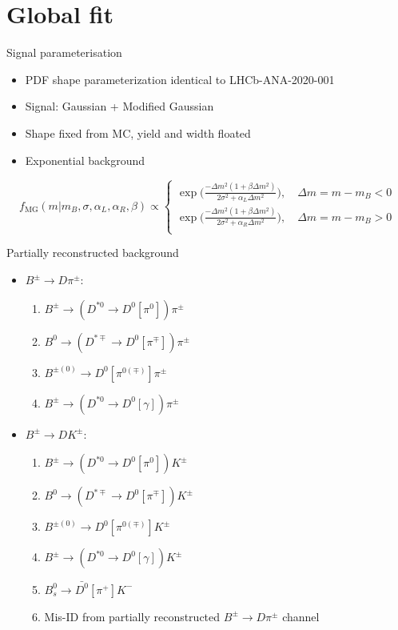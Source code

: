 \documentclass{beamer}
\begin{document}
\section{Global fit}
\begin{frame}{Signal parameterisation}
  \begin{itemize}
    \setlength\itemsep{1.2em}
    \item{PDF shape parameterization identical to LHCb-ANA-2020-001}
    \item{Signal: Gaussian + Modified Gaussian}
    \item{Shape fixed from MC, yield and width floated}
    \item{Exponential background}
  \end{itemize}
  \vspace{0.5cm}
  \begin{equation*}
    f_\text{MG}(m|m_B, \sigma, \alpha_L, \alpha_R, \beta)\propto
    \begin{cases}
      \exp\Big(\frac{-\Delta m^2(1 + \beta\Delta m^2)}{2\sigma^2 + \alpha_L\Delta m^2}\Big), \quad \Delta m = m - m_B < 0 \\
      \exp\Big(\frac{-\Delta m^2(1 + \beta\Delta m^2)}{2\sigma^2 + \alpha_R\Delta m^2}\Big), \quad \Delta m = m - m_B > 0 \\
    \end{cases}
  \end{equation*}
\end{frame}

\begin{frame}{Partially reconstructed background}
  \begin{itemize}
    \setlength\itemsep{1.3em}
    \item{$B^\pm\to D\pi^\pm$:}
    \begin{enumerate}
    \setlength\itemsep{0.4em}
      \item{$B^\pm\to (D^{*0}\to D^0[\pi^0])\pi^\pm$}
      \item{$B^0\to (D^{*\mp}\to D^0[\pi^\mp])\pi^\pm$}
      \item{$B^{\pm(0)}\to D^0[\pi^{0(\mp)}]\pi^\pm$}
      \item{$B^\pm\to(D^{*0}\to D^0[\gamma])\pi^\pm$}
    \end{enumerate}
    \item{$B^\pm\to DK^\pm$:}
    \begin{enumerate}
      \setlength\itemsep{0.4em}
      \item{$B^\pm\to (D^{*0}\to D^0[\pi^0])K^\pm$}
      \item{$B^0\to (D^{*\mp}\to D^0[\pi^\mp])K^\pm$}
      \item{$B^{\pm(0)}\to D^0[\pi^{0(\mp)}]K^\pm$}
      \item{$B^\pm\to(D^{*0}\to D^0[\gamma])K^\pm$}
      \item{$B_s^0\to\bar{D^0}[\pi^+]K^-$}
      \item{Mis-ID from partially reconstructed $B^\pm\to D\pi^\pm$ channel}
    \end{enumerate}
  \end{itemize}
\end{frame}
\end{document}
